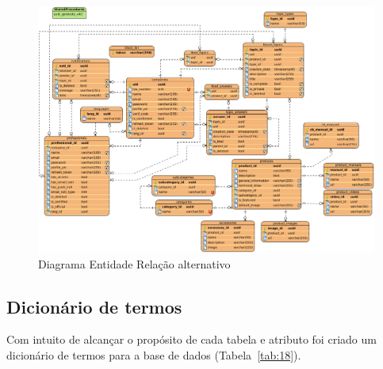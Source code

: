 \begin{figure}[htb]
  \centering
  
  \includegraphics[width=\textwidth]{images/diagramas/diagrama_bd_alt.png}
  \caption{Diagrama Entidade Relação alternativo}
  \label{fig:21}
\end{figure}

\newpage

\subsection{Dicionário de termos}

Com intuito de alcançar o propósito de cada tabela e atributo 
foi criado um dicionário de termos para a base de dados (Tabela~\ref{tab:18}).


